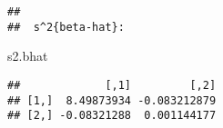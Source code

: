 \documentclass[
]{article}
\newenvironment{Shaded}{\begin{snugshade}}{\end{snugshade}}
\newcommand{\NormalTok}[1]{#1}
\begin{document}
\begin{verbatim}
## 
##  s^2{beta-hat}:
\end{verbatim}

\begin{Shaded}
\begin{Highlighting}[]
\NormalTok{s2.bhat}
\end{Highlighting}
\end{Shaded}

\begin{verbatim}
##             [,1]         [,2]
## [1,]  8.49873934 -0.083212879
## [2,] -0.08321288  0.001144177
\end{verbatim}
\end{document}
